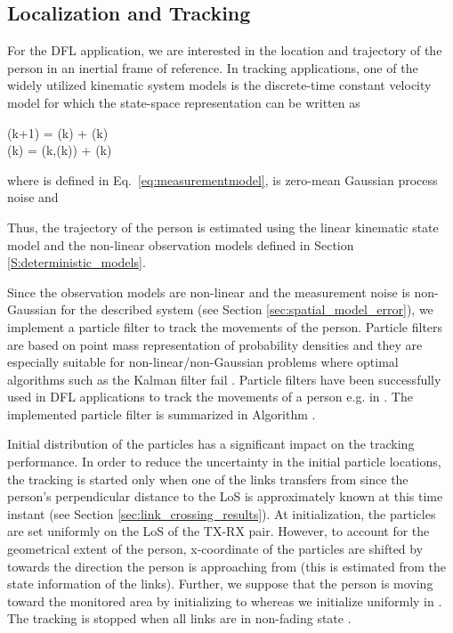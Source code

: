 \documentclass[journal, 10pt, twocolumn, balance]{IEEEtran}
\begin{document}
\subsection{Localization and Tracking}\label{sec:tracking}


For the DFL application, we are interested in the location and trajectory of the person in an inertial frame of reference. In tracking applications, one of the widely utilized kinematic system models is the discrete-time constant velocity model \cite[Ch. 6]{BarShalom2001} for which the state-space representation can be written as

	(k+1) =  (k) +  (k) \\
	(k) = (k,(k)) + \bm{\nu}(k)

where  is defined in Eq.~\eqref{eq:measurementmodel},  is zero-mean Gaussian process noise and 

Thus, the trajectory of the person is estimated using the linear kinematic state model and the non-linear observation models defined in Section \ref{S:deterministic_models}.


Since the observation models are non-linear and the measurement noise is non-Gaussian for the described system (see Section \ref{sec:spatial_model_error}), we implement a particle filter to track the movements of the person. Particle filters are based on point mass representation of probability densities and they are especially suitable for non-linear/non-Gaussian problems where optimal algorithms such as the Kalman filter fail \cite{Arulampalam2002}. Particle filters have been successfully used in DFL applications to track the movements of a person e.g. in \cite{Wilson2012,Zheng2012,li2011,Guo2013}. The implemented particle filter is summarized in Algorithm .

Initial distribution of the particles has a significant impact on the tracking performance. In order to reduce the uncertainty in the initial particle locations, the tracking is started only when one of the links transfers from  since the person's perpendicular distance to the LoS is approximately known at this time instant (see Section \ref{sec:link_crossing_results}). At initialization, the particles are set uniformly on the LoS of the TX-RX pair. However, to account for the geometrical extent of the person, x-coordinate of the particles are shifted by  towards the direction the person is approaching from (this is estimated from the state information of the links). Further, we suppose that the person is moving toward the monitored area by initializing  to  whereas we initialize  uniformly in . The tracking is stopped when all links are in non-fading state .
\end{document}
